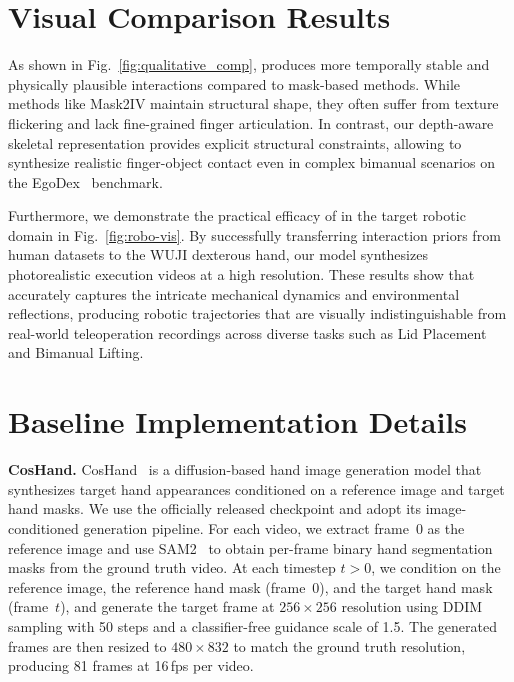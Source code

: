 \noindent 
\section{Visual Comparison Results} 
As shown in Fig.~\ref{fig:qualitative_comp}, \our produces more temporally stable and physically plausible interactions compared to mask-based methods. While methods like Mask2IV maintain structural shape, they often suffer from texture flickering and lack fine-grained finger articulation. In contrast, our depth-aware skeletal representation provides explicit structural constraints, allowing \our to synthesize realistic finger-object contact even in complex bimanual scenarios on the EgoDex~\citep{hoque2025egodex} benchmark.

Furthermore, we demonstrate the practical efficacy of \our in the target robotic domain in Fig.~\ref{fig:robo-vis}. By successfully transferring interaction priors from human datasets to the WUJI dexterous hand, our model synthesizes photorealistic execution videos at a high resolution. These results show that \our accurately captures the intricate mechanical dynamics and environmental reflections, producing robotic trajectories that are visually indistinguishable from real-world teleoperation recordings across diverse tasks such as Lid Placement and Bimanual Lifting.



\section{Baseline Implementation Details} 
\noindent 
\textbf{CosHand.}
CosHand~\citep{sudhakar2024controlling} is a diffusion-based hand image generation model that synthesizes target hand appearances conditioned on a reference image and target hand masks. We use the officially released checkpoint and adopt its image-conditioned generation pipeline. For each video, we extract frame~0 as the reference image and use SAM2~\citep{ravi2025sam} to obtain per-frame binary hand segmentation masks from the ground truth video. At each timestep $t>0$, we condition on the reference image, the reference hand mask (frame~0), and the target hand mask (frame~$t$), and generate the target frame at $256\times 256$ resolution using DDIM sampling with 50 steps and a classifier-free guidance scale of 1.5. The generated frames are then resized to $480\times 832$ to match the ground truth resolution, producing 81 frames at 16\,fps per video.



